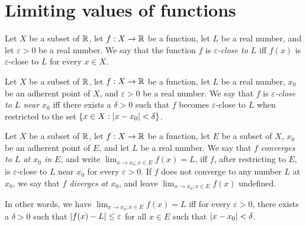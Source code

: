 \section{Limiting values of functions}\label{i:sec:9.3}

\begin{defn}\label{i:9.3.1}
  Let \(X\) be a subset of \(\mathbb{R}\), let \(f : X \to \mathbb{R}\) be a function, let \(L\) be a real number, and let \(\varepsilon > 0\) be a real number.
  We say that the function \(f\) is \emph{\(\varepsilon\)-close to \(L\)} iff \(f(x)\) is \(\varepsilon\)-close to \(L\) for every \(x \in X\).
\end{defn}

\setcounter{thm}{2}
\begin{defn}\label{i:9.3.3}
  Let \(X\) be a subset of \(\mathbb{R}\), let \(f : X \to \mathbb{R}\) be a function, let \(L\) be a real number, \(x_0\) be an adherent point of \(X\), and \(\varepsilon > 0\) be a real number.
  We say that \(f\) is \emph{\(\varepsilon\)-close to \(L\) near \(x_0\)} iff there exists a \(\delta > 0\) such that \(f\) becomes \(\varepsilon\)-close to \(L\) when restricted to the set \(\left\lbrace x \in X : \left\lvert x - x_0\right\rvert < \delta\right\rbrace\).
\end{defn}

\setcounter{thm}{5}
\begin{defn}\label{i:9.3.6}
  Let \(X\) be a subset of \(\mathbb{R}\), let \(f : X \to \mathbb{R}\) be a function, let \(E\) be a subset of \(X\), \(x_0\) be an adherent point of \(E\), and let \(L\) be a real number.
  We say that \emph{\(f\) converges to \(L\) at \(x_0\) in \(E\)}, and write \(\lim_{x \to x_0 ; x \in E} f(x) = L\), iff \(f\), after restricting to \(E\), is \(\varepsilon\)-close to \(L\) near \(x_0\) for every \(\varepsilon > 0\).
  If \(f\) does not converge to any number \(L\) at \(x_0\), we say that \emph{\(f\) diverges at \(x_0\)}, and leave \(\lim_{x \to x_0 ; x \in E} f(x)\) undefined.
\end{defn}

\begin{note}
  In other words, we have \(\lim_{x \to x_0 ; x \in E} f(x) = L\) iff for every \(\varepsilon > 0\), there exists a \(\delta > 0\) such that \(\left\lvert f(x) - L\right\rvert \leq \varepsilon\) for all \(x \in E\) such that \(\left\lvert x - x_0\right\rvert < \delta\).
\end{note}

